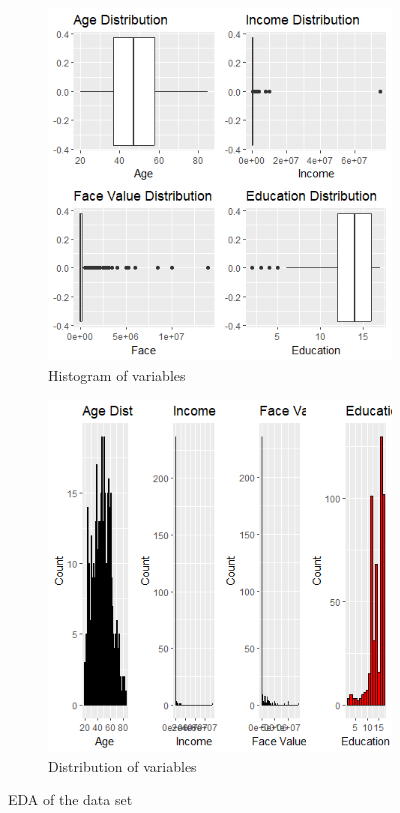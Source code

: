 \documentclass[12pt, twoside,hidelinks]{article}
\theoremstyle{definition}
\numberwithin{equation}{section}
\begin{document}
\begin{figure}[H]
    \centering
    \begin{subfigure}[b]{0.45\textwidth}
        \includegraphics[width=\textwidth]{visuals/InsuranceVisuals/UstermHist.png}
        \caption{Histogram of variables}
        \label{fig:hist_of_variables}
    \end{subfigure}
    \hfill
    \begin{subfigure}[b]{0.45\textwidth}
        \includegraphics[width=\textwidth]{visuals/InsuranceVisuals/UstermDist.png}
        \caption{Distribution of variables}
        \label{fig:Distribution_of_variables}
    \end{subfigure}
    \caption{EDA of the data set}
    \label{fig:test_data_performance_1}
\end{figure}
\end{document}
